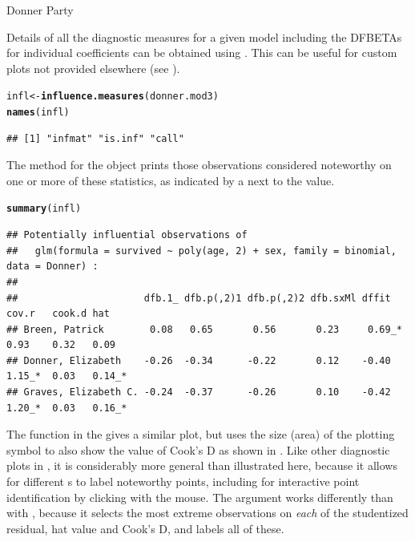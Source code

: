 \documentclass[11pt]{book}\usepackage[]{graphicx}\usepackage[]{color}
\makeatletter
\newcommand{\hlstd}[1]{\textcolor[rgb]{0.345,0.345,0.345}{#1}}%
\newcommand{\hlkwb}[1]{\textcolor[rgb]{0.69,0.353,0.396}{#1}}%
\newcommand{\hlkwd}[1]{\textcolor[rgb]{0.737,0.353,0.396}{\textbf{#1}}}%
\newenvironment{kframe}{%
 \def\at@end@of@kframe{}%
 \ifinner\ifhmode%
  \def\at@end@of@kframe{\end{minipage}}%
  \begin{minipage}{\columnwidth}%
 \fi\fi%
 \def\FrameCommand##1{\hskip\@totalleftmargin \hskip-\fboxsep
 \colorbox{shadecolor}{##1}\hskip-\fboxsep
     \hskip-\linewidth \hskip-\@totalleftmargin \hskip\columnwidth}%
 \MakeFramed {\advance\hsize-\width
   \@totalleftmargin\z@ \linewidth\hsize
   \@setminipage}}%
 {\par\unskip\endMakeFramed%
 \at@end@of@kframe}
\newenvironment{knitrout}{}{} %
\renewenvironment{knitrout}{\small\renewcommand{\baselinestretch}{.85}}{} %
\makeatother
\begin{document}
\begin{Example}[donner2]{Donner Party}
\begin{knitrout}
\end{knitrout}

Details of all the diagnostic measures for a given model including the DFBETAs for
individual coefficients can be obtained using .
This can be useful for custom plots not provided elsewhere (see ).
\begin{knitrout}
\color{fgcolor}\begin{kframe}
\begin{alltt}
\hlstd{infl} \hlkwb{<-} \hlkwd{influence.measures}\hlstd{(donner.mod3)}
\hlkwd{names}\hlstd{(infl)}
\end{alltt}
\begin{verbatim}
## [1] "infmat" "is.inf" "call"
\end{verbatim}
\end{kframe}
\end{knitrout}
The  method for the  object prints those
observations considered noteworthy on one or more of these statistics, as indicated
by a  next to the value.  
\begin{knitrout}\footnotesize
{}\color{fgcolor}\begin{kframe}
\begin{alltt}
\hlkwd{summary}\hlstd{(infl)}
\end{alltt}
\begin{verbatim}
## Potentially influential observations of
## 	 glm(formula = survived ~ poly(age, 2) + sex, family = binomial,      data = Donner) :
## 
##                      dfb.1_ dfb.p(,2)1 dfb.p(,2)2 dfb.sxMl dffit   cov.r   cook.d hat    
## Breen, Patrick        0.08   0.65       0.56       0.23     0.69_*  0.93    0.32   0.09  
## Donner, Elizabeth    -0.26  -0.34      -0.22       0.12    -0.40    1.15_*  0.03   0.14_*
## Graves, Elizabeth C. -0.24  -0.37      -0.26       0.10    -0.42    1.20_*  0.03   0.16_*
\end{verbatim}
\end{kframe}
\end{knitrout}


The function  in the  gives a similar plot, but uses the size (area)
of the plotting symbol to also show the value of Cook's D as shown in .  
Like other diagnostic plots
in , it is considerably more general than illustrated here, because
it allows for different s to label noteworthy points, including
 for interactive point identification by clicking with
the mouse. The  argument works differently than with , 
because it selects the most extreme  observations on \emph{each} of
the studentized residual, hat value and Cook's D, and labels all of these.


\end{Example}
\end{document}
